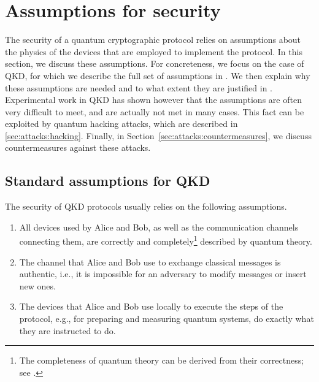 \section{Assumptions for security}
\label{sec:attacks}

The security of a quantum cryptographic protocol relies on assumptions about the physics of the devices that are employed to implement the protocol.  In this section, we discuss these assumptions. For concreteness, we focus on the case of QKD, for which we describe the full set of assumptions in .  We then explain why these assumptions are needed and to what extent they are justified in . Experimental work in QKD has shown however that the assumptions are often very difficult to meet, and are actually not met in many cases. This fact can be exploited by quantum hacking attacks, which are described in \ref{sec:attacks:hacking}. Finally, in Section~\ref{sec:attacks:countermeasures}, we discuss countermeasures against these attacks. 

\subsection{Standard assumptions for QKD} \label{sec:attacks:assumptionlist}

The security of QKD protocols usually relies on the following assumptions.

\begin{enumerate}
  \item \label{item_qm} All devices used by Alice and Bob, as well as the communication channels connecting them, are correctly and completely\footnote{The completeness of quantum theory can be derived from their correctness;  see .} described by quantum theory.
    \item \label{item_res} The channel that Alice and Bob use to exchange classical messages is authentic, i.e., it is impossible for an adversary to modify messages or insert new ones. 
  \item \label{item_conv} The devices that Alice and Bob use locally to execute the steps of the protocol, e.g., for preparing and measuring quantum systems, do exactly what they are instructed to do.
\end{enumerate}

